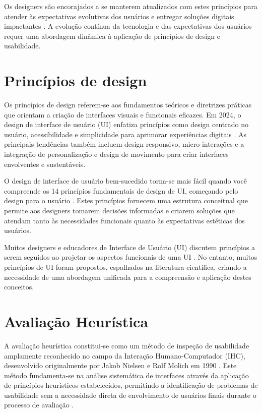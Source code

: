 Os designers são encorajados a se manterem atualizados com estes princípios para atender às expectativas evolutivas dos usuários e entregar soluções digitais impactantes \cite{medium_ui_principles_2025}. A evolução contínua da tecnologia e das expectativas dos usuários requer uma abordagem dinâmica à aplicação de princípios de design e usabilidade.

\section{Princípios de design}

Os princípios de design referem-se aos fundamentos teóricos e diretrizes práticas que orientam a criação de interfaces visuais e funcionais eficazes. Em 2024, o design de interface de usuário (UI) enfatiza princípios como design centrado no usuário, acessibilidade e simplicidade para aprimorar experiências digitais \cite{slideshare_ui_principles_2024}. As principais tendências também incluem design responsivo, micro-interações e a integração de personalização e design de movimento para criar interfaces envolventes e sustentáveis.

O design de interface de usuário bem-sucedido torna-se mais fácil quando você compreende os 14 princípios fundamentais de design de UI, começando pelo design para o usuário \cite{uxpin_ui_principles}. Estes princípios fornecem uma estrutura conceitual que permite aos designers tomarem decisões informadas e criarem soluções que atendam tanto às necessidades funcionais quanto às expectativas estéticas dos usuários.

Muitos designers e educadores de Interface de Usuário (UI) discutem princípios a serem seguidos ao projetar os aspectos funcionais de uma UI \cite{tandfonline_ui_principles}. No entanto, muitos princípios de UI foram propostos, espalhados na literatura científica, criando a necessidade de uma abordagem unificada para a compreensão e aplicação destes conceitos.

\section{Avaliação Heurística}
A avaliação heurística constitui-se como um método de inspeção de usabilidade amplamente reconhecido no campo da Interação Humano-Computador (IHC), desenvolvido originalmente por Jakob Nielsen e Rolf Molich em 1990 \cite{nielsen1990heuristic}. Este método fundamenta-se na análise sistemática de interfaces através da aplicação de princípios heurísticos estabelecidos, permitindo a identificação de problemas de usabilidade sem a necessidade direta de envolvimento de usuários finais durante o processo de avaliação \cite{nielsen1994usability}.

